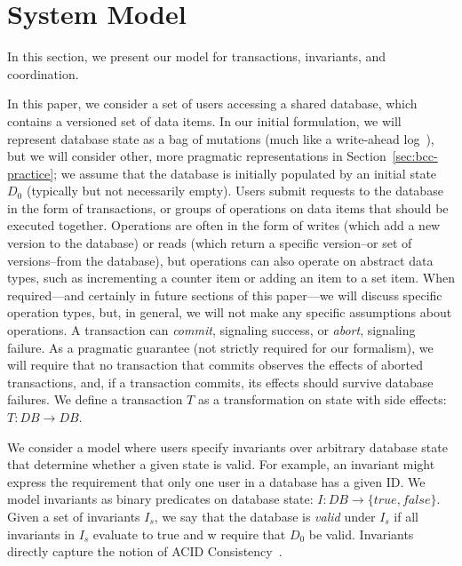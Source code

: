 
\section{System Model}
\label{sec:model}

In this section, we present our model for transactions, invariants,
and coordination.

 In this paper, we consider a set of users
accessing a shared database, which contains a versioned set of data
items. In our initial formulation, we will represent database state as
a bag of mutations (much like a write-ahead log~\cite{gray-book}), but
we will consider other, more pragmatic representations in
Section~\ref{sec:bcc-practice}; we assume that the database is
initially populated by an initial state $D_0$ (typically but not
necessarily empty). Users submit requests to the database in the form
of transactions, or groups of operations on data items that should be
executed together. Operations are often in the form of writes (which
add a new version to the database) or reads (which return a specific
version--or set of versions--from the database), but operations can
also operate on abstract data types, such as incrementing a counter
item or adding an item to a set item. When required---and certainly in
future sections of this paper---we will discuss specific operation
types, but, in general, we will not make any specific assumptions
about operations. A transaction can \textit{commit}, signaling
success, or \textit{abort}, signaling failure. As a pragmatic
guarantee (not strictly required for our formalism), we will require
that no transaction that commits observes the effects of aborted
transactions, and, if a transaction commits, its effects should
survive database failures. We define a transaction $T$ as a
transformation on state with side effects: $T: DB \rightarrow DB$.

 We consider a model where users specify
invariants over arbitrary database state that determine whether a
given state is valid. For example, an invariant might express the
requirement that only one user in a database has a given ID.  We model
invariants as binary predicates on database state: $I: DB \rightarrow
\{true, false\}$. Given a set of invariants $I_s$, we say that the
database is \textit{valid} under $I_s$ if all invariants in $I_s$
evaluate to true and w require that $D_0$ be valid. Invariants
directly capture the notion of ACID
Consistency~\cite{bernstein-book,gray-virtues}.

